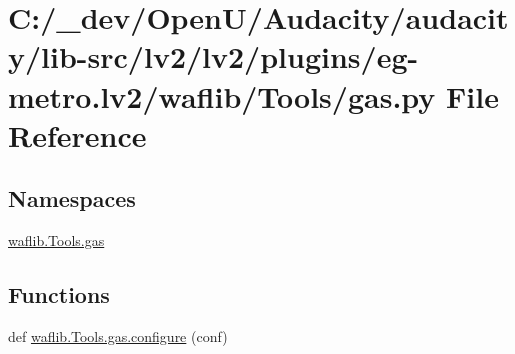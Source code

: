 \hypertarget{lv2_2plugins_2eg-metro_8lv2_2waflib_2_tools_2gas_8py}{}\section{C\+:/\+\_\+dev/\+Open\+U/\+Audacity/audacity/lib-\/src/lv2/lv2/plugins/eg-\/metro.lv2/waflib/\+Tools/gas.py File Reference}
\label{lv2_2plugins_2eg-metro_8lv2_2waflib_2_tools_2gas_8py}
\subsection*{Namespaces}
\begin{DoxyCompactItemize}
\item 
 \hyperlink{namespacewaflib_1_1_tools_1_1gas}{waflib.\+Tools.\+gas}
\end{DoxyCompactItemize}
\subsection*{Functions}
\begin{DoxyCompactItemize}
\item 
def \hyperlink{namespacewaflib_1_1_tools_1_1gas_ad1cc79a9a3edafdd0c92e0198ba5f802}{waflib.\+Tools.\+gas.\+configure} (conf)
\end{DoxyCompactItemize}
